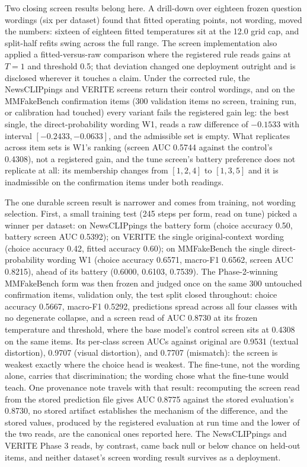 \documentclass[conference]{IEEEtran}
\begin{document}
Two closing screen results belong here. A drill-down over eighteen frozen question wordings (six per dataset) found that fitted operating points, not wording, moved the numbers: sixteen of eighteen fitted temperatures sit at the 12.0 grid cap, and split-half refits swing across the full range. The screen implementation also applied a fitted-versus-raw comparison where the registered rule reads gains at $T=1$ and threshold 0.5; that deviation changed one deployment outright and is disclosed wherever it touches a claim. Under the corrected rule, the NewsCLIPpings and VERITE screens return their control wordings, and on the MMFakeBench confirmation items (300 validation items no screen, training run, or calibration had touched) every variant fails the registered gain leg: the best single, the direct-probability wording W1, reads a raw difference of $-0.1533$ with interval $[-0.2433, -0.0633]$, and the admissible set is empty. What replicates across item sets is W1's ranking (screen AUC 0.5744 against the control's 0.4308), not a registered gain, and the tune screen's battery preference does not replicate at all: its membership changes from $[1, 2, 4]$ to $[1, 3, 5]$ and it is inadmissible on the confirmation items under both readings.

The one durable screen result is narrower and comes from training, not wording selection. First, a small training test (245 steps per form, read on tune) picked a winner per dataset: on NewsCLIPpings the battery form (choice accuracy 0.50, battery screen AUC 0.5392); on VERITE the single original-context wording (choice accuracy 0.42, fitted accuracy 0.60); on MMFakeBench the single direct-probability wording W1 (choice accuracy 0.6571, macro-F1 0.6562, screen AUC 0.8215), ahead of its battery (0.6000, 0.6103, 0.7539). The Phase-2-winning MMFakeBench form was then frozen and judged once on the same 300 untouched confirmation items, validation only, the test split closed throughout: choice accuracy 0.5667, macro-F1 0.5292, predictions spread across all four classes with no degenerate collapse, and a screen read of AUC 0.8730 at its frozen temperature and threshold, where the base model's control screen sits at 0.4308 on the same items. Its per-class screen AUCs against original are 0.9531 (textual distortion), 0.9707 (visual distortion), and 0.7707 (mismatch): the screen is weakest exactly where the choice head is weakest. The fine-tune, not the wording alone, carries that discrimination; the wording chose what the fine-tune would teach. One provenance note travels with that result: recomputing the screen read from the stored prediction file gives AUC 0.8775 against the stored evaluation's 0.8730, no stored artifact establishes the mechanism of the difference, and the stored values, produced by the registered evaluation at run time and the lower of the two reads, are the canonical ones reported here. The NewsCLIPpings and VERITE Phase 3 reads, by contrast, came back null or below chance on held-out items, and neither dataset's screen wording result survives as a deployment.
\end{document}
